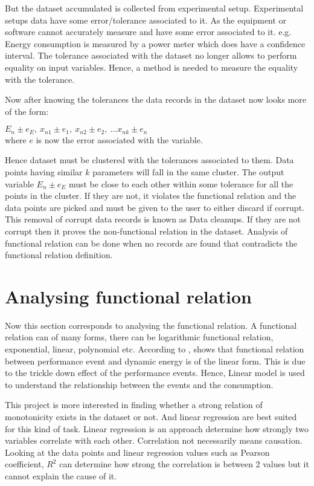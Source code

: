 But the dataset accumulated is collected from experimental setup. Experimental setups data have some error/tolerance associated to it. As the equipment or software cannot accurately measure and have some error associated to it. e.g. Energy consumption is measured by a power meter which does have a confidence interval. The tolerance associated with the dataset no longer allows to perform equality on input variables. Hence, a method is needed to measure the equality with the tolerance.

Now after knowing the tolerances the data records in the dataset now looks more of the form:

\(E_n \pm e_E,\ x_{n1} \pm e_1,\ x_{n2} \pm e_2,\ \ldots x_{nk} \pm e_n\)\\
where \(e\) is now the error associated with the variable.

Hence dataset must be clustered with the tolerances associated to them. Data points having similar \(k\) parameters will fall in the same cluster. The output variable \(E_n \pm e_E\) must be close to each other within some tolerance for all the points in the cluster. If they are not, it violates the functional relation and the data points are picked and must be given to the user to either discard if corrupt. This removal of corrupt data records is known as Data cleanups. If they are not corrupt then it proves the non-functional relation in the dataset. Analysis of functional relation can be done when no records are found that contradicts the functional relation definition.

\section{Analysing functional relation}

Now this section corresponds to analysing the functional relation. A functional relation can of many forms, there can be logarithmic functional relation, exponential, linear, polynomial etc. According to \cite{bircher2007complete}, shows that functional relation between performance event and dynamic energy is of the linear form. This is due to the trickle down effect of the performance events. Hence, Linear model is used to understand the relationship between the events and the consumption. 

This project is more interested in finding whether a strong relation of monotonicity exists in the dataset or not. And linear regression are best suited for this kind of task. Linear regression is an approach determine how strongly two variables correlate with each other. Correlation not necessarily means causation. Looking at the data points and linear regression values such as Pearson coefficient, $R^2$ can determine how strong the correlation is between 2 values but it cannot explain the cause of it.

